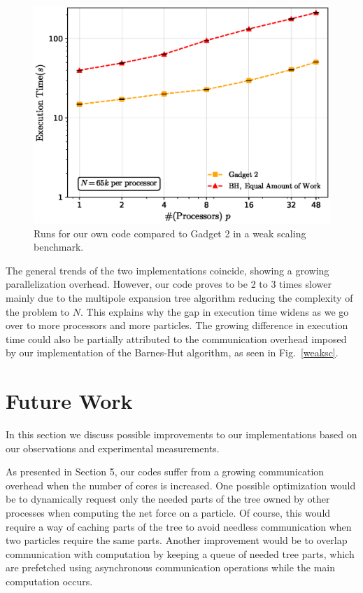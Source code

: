 \documentclass[letterpaper]{article}
\begin{document}
\begin{figure}[h]
 \centering
 \includegraphics[scale=0.4]{figs/gadget_benchmark.eps}
  \caption{Runs for our own code compared to Gadget 2 in a weak scaling benchmark.\label{gadget}}
\end{figure}

The general trends of the two implementations coincide, showing a growing parallelization overhead. However, our code proves to be 2 to 3 times slower mainly due to the multipole expansion tree algorithm reducing the complexity of the problem to $N$. This explains why the gap in execution time widens as we go over to more processors and more particles. The growing difference in execution time could also be partially attributed to the communication overhead imposed by our implementation of the Barnes-Hut algorithm, as seen in Fig.~\ref{weaksc}.

\section{Future Work}

In this section we discuss possible improvements to our implementations based on our observations and experimental measurements.

As presented in Section 5, our codes suffer from a growing communication overhead when the number of cores is increased. One possible optimization would be to dynamically request only the needed parts of the tree owned by other processes when computing the net force on a particle. Of course, this would require a way of caching parts of the tree to avoid needless communication when two particles require the same parts. Another improvement would be to overlap communication with computation by keeping a queue of needed tree parts, which are prefetched using asynchronous communication operations while the main computation occurs.
\end{document}

